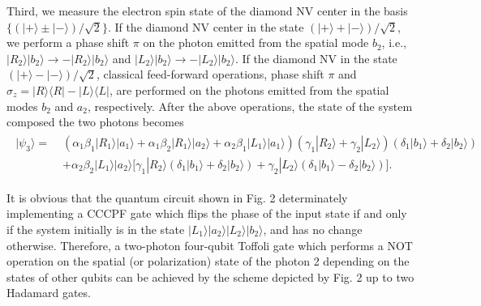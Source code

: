 \documentclass[showpacs,preprintnumbers,showkeys,amsmath,amssymb]{revtex4}%
\begin{document}
Third, we measure the electron spin state of the diamond NV center in the basis  $\{(|+\rangle\pm|-\rangle)/\sqrt{2}\}$. If the diamond NV center in the state  $(|+\rangle+|-\rangle)/\sqrt{2}$, we perform a phase shift $\pi$ on the photon emitted from the spatial mode $b_2$, i.e., $|R_2\rangle|b_2\rangle \rightarrow -|R_2\rangle|b_2\rangle $ and $|L_2\rangle|b_2\rangle \rightarrow -|L_2\rangle|b_2\rangle$. If the diamond NV  in the state  $(|+\rangle-|-\rangle)/\sqrt{2}$,  classical feed-forward operations, phase shift $\pi$ and  $\sigma_z=|R\rangle\langle R|-|L\rangle\langle L|$, are performed on the photons emitted from the spatial modes $b_2$ and $a_2$, respectively.  After the above operations, the state of the system composed the two photons becomes
\begin{eqnarray}       \label{eq10}
\begin{split}
|\psi_3\rangle=\;&
(\alpha_{1}\beta_{1}|R_1\rangle|a_1\rangle+\alpha_{1}\beta_{2}|R_1\rangle|a_2\rangle+\alpha_{2}\beta_{1}|L_1\rangle|a_1\rangle)(\gamma_{1}|R_2\rangle + \gamma_{2}|L_2\rangle)(\delta_{1}|b_1\rangle + \delta_{2}|b_2\rangle)\\&
%
+\alpha_{2}\beta_{2}|L_1\rangle|a_2\rangle\big[\gamma_{1}|R_2\rangle (\delta_{1}|b_1\rangle + \delta_{2}|b_2\rangle)
                                               + \gamma_{2}|L_2\rangle (\delta_{1}|b_1\rangle - \delta_{2}|b_2\rangle)\big].
\end{split}
\end{eqnarray}


It is obvious that the quantum circuit shown in Fig. 2 determinately implementing a CCCPF gate which flips the phase of the input state if and only if the system initially is in the state $|L_1\rangle|a_2\rangle|L_2\rangle|b_2\rangle$, and has no change otherwise. Therefore, a two-photon four-qubit Toffoli gate which performs a NOT operation on the spatial (or polarization) state of the photon 2 depending on the states of other qubits can be achieved by the scheme depicted by Fig. 2 up to two Hadamard gates.



\end{document}
